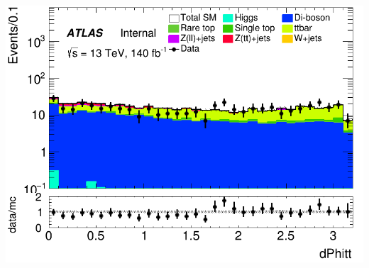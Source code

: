 \documentclass[usenames,dvipsnames]{beamer}
\begin{document}
\begin{frame}
\begin{minipage}{0.32\textwidth}
        \includegraphics[width=\textwidth]{graphics/LLH_met/LLH_met_dPhitt.png}
    \end{minipage}
\end{frame}
\end{document}
